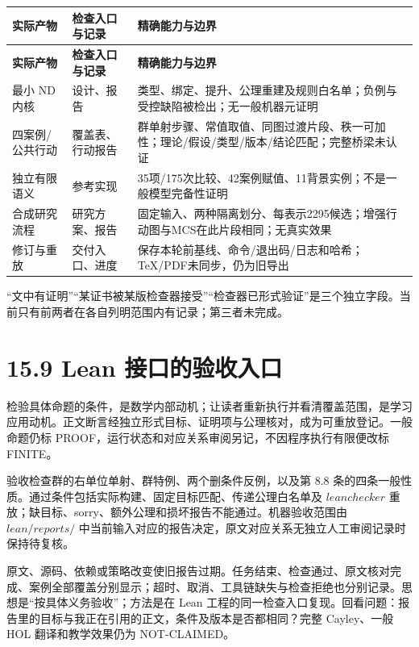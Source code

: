 \documentclass[UTF8,a4paper,zihao=-4,fontset=windows,openany]{ctexbook}
\def\mathrm#1{#1}%
\begin{document}
\begingroup\small\setlength{\tabcolsep}{4pt}
\begin{longtable}{>{\raggedright\arraybackslash}p{}>{\raggedright\arraybackslash}p{}>{\raggedright\arraybackslash}p{}}
\toprule
\textbf{实际产物} & \textbf{检查入口与记录} & \textbf{精确能力与边界} \\
\midrule
\endfirsthead
\toprule
\textbf{实际产物} & \textbf{检查入口与记录} & \textbf{精确能力与边界} \\
\midrule
\endhead
\bottomrule
\endfoot
\bottomrule
\endlastfoot
最小 ND 内核 & 设计、报告 & 类型、绑定、提升、公理重建及规则白名单；负例与受控缺陷被检出；无一般机器元证明 \\
四案例/公共行动 & 覆盖表、行动报告 & 群单射步骤、常值取值、同图过渡片段、秩一可加性；理论/假设/类型/版本/结论匹配；完整桥梁未认证 \\
独立有限语义 & 参考实现 & 35项/175次比较、42案例赋值、11背景实例；不是一般模型完备性证明 \\
合成研究流程 & 研究方案、报告 & 固定输入、两种隔离划分、每表示2295候选；增强行动图与MCS在此片段相同；无真实效果 \\
修订与重放 & 交付入口、进度 & 保存本轮前基线、命令/退出码/日志和哈希；TeX/PDF未同步，仍为旧导出 \\
\end{longtable}
\endgroup

“文中有证明”“某证书被某版检查器接受”“检查器已形式验证”是三个独立字段。当前只有前两者在各自列明范围内有记录；第三者未完成。

\section{15.9 Lean 接口的验收入口}
检验具体命题的条件，是数学内部动机；让读者重新执行并看清覆盖范围，是学习应用动机。正文断言经独立形式目标、证明项与公理核对，成为可重放登记。一般命题仍标 PROOF，运行状态和对应关系审阅另记，不因程序执行有限便改标 FINITE。

验收检查群的右单位单射、群特例、两个删条件反例，以及第 8.8 条的四条一般性质。通过条件包括实际构建、固定目标匹配、传递公理白名单及 \(\mathrm{leanchecker}\) 重放；缺目标、sorry、额外公理和损坏报告不能通过。机器验收范围由 \(\mathrm{lean}/\mathrm{reports}/\) 中当前输入对应的报告决定，原文对应关系无独立人工审阅记录时保持待复核。

原文、源码、依赖或策略改变使旧报告过期。任务结束、检查通过、原文核对完成、案例全部覆盖分别显示；超时、取消、工具链缺失与检查拒绝也分别记录。思想是“按具体义务验收”；方法是在 Lean 工程的同一检查入口复现。回看问题：报告里的目标与我正在引用的正文，条件及版本是否都相同？完整 Cayley、一般 HOL 翻译和教学效果仍为 NOT-CLAIMED。
\end{document}
